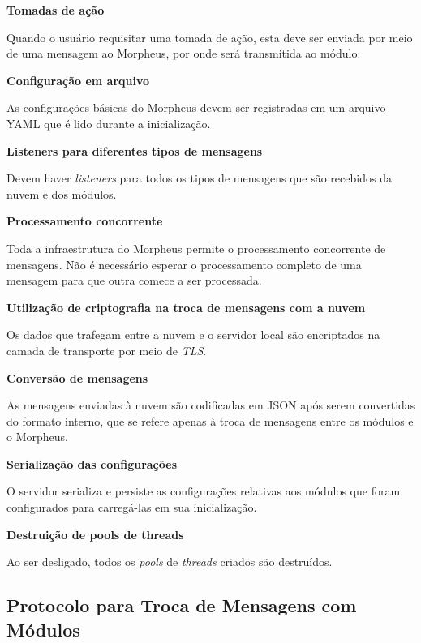 \begin{description}
\item \textbf{Tomadas de ação}

Quando o usuário requisitar uma tomada de ação, esta deve ser enviada por meio de uma mensagem ao Morpheus, por onde será transmitida ao módulo.

\item \textbf{Configuração em arquivo}

As configurações básicas do Morpheus devem ser registradas em um arquivo YAML que é lido durante a inicialização.

\item \textbf{Listeners para diferentes tipos de mensagens}

Devem haver \emph{listeners} para todos os tipos de mensagens que são recebidos da nuvem e dos módulos.

\item \textbf{Processamento concorrente}

Toda a infraestrutura do Morpheus permite o processamento concorrente de mensagens. Não é necessário esperar o processamento completo de uma mensagem para que outra comece a ser processada.

\item \textbf{Utilização de criptografia na troca de mensagens com a nuvem}

Os dados que trafegam entre a nuvem e o servidor local são encriptados na camada de transporte por meio de \emph{TLS}.

\item \textbf{Conversão de mensagens}

As mensagens enviadas à nuvem são codificadas em JSON após serem convertidas do formato interno, que se refere apenas à troca de mensagens entre os módulos e o Morpheus.

\item \textbf{Serialização das configurações}

O servidor serializa e persiste as configurações relativas aos módulos que foram configurados para carregá-las em sua inicialização.

\item \textbf{Destruição de pools de threads}

Ao ser desligado, todos os \emph{pools} de \emph{threads} criados são destruídos.

\end{description}

\subsection{Protocolo para Troca de Mensagens com Módulos}

